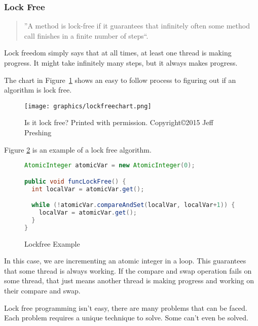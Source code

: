 \documentclass[letterpaper, 12pt]{article}
\begin{document}
\subsubsection{Lock Free}
\begin{quotation}
	''A method is lock-free if it guarantees that infinitely often some method call finishes 
	in a finite number of steps``\citep[p. 60]{artofmulti}.
\end{quotation}

Lock freedom simply says that at all times, at least one thread is making progress. It might 
take infinitely many steps, but it always makes progress.  
\par\vspace{\baselineskip}

The chart in Figure~\ref{lockfreechart} shows an easy to follow process to figuring out if an algorithm is lock free.

\begin{figure}
    \centering
	\texttt{[image: graphics/lockfreechart.png]}
    \caption{Is it lock free? Printed with permission. Copyright\copyright 2015 Jeff Preshing}
    \citep{introlockfree} 
    \label{lockfreechart}
\end{figure}

Figure \ref{fig:lockfree_ex} is an example of a lock free algorithm.
\par\vspace{\baselineskip}

\begin{figure}
\begin{lstlisting}[language=Java]
AtomicInteger atomicVar = new AtomicInteger(0);

public void funcLockFree() {
  int localVar = atomicVar.get();

  while (!atomicVar.compareAndSet(localVar, localVar+1)) {
    localVar = atomicVar.get();
  }
}
\end{lstlisting} 
\caption{Lockfree Example} \label{fig:lockfree_ex}
\citep{concurrencyfreaks}
\end{figure}


In this case, we are incrementing an atomic integer in a loop. This guarantees that 
some thread is always working. If the compare and swap operation fails on some thread, 
that just means another thread is making progress and working on their compare and swap.
\par\vspace{\baselineskip}

Lock free programming isn't easy, there are many problems that can be faced. Each 
problem requires a unique technique to solve. Some can't even be solved. 
\par\vspace{\baselineskip}
\end{document}
